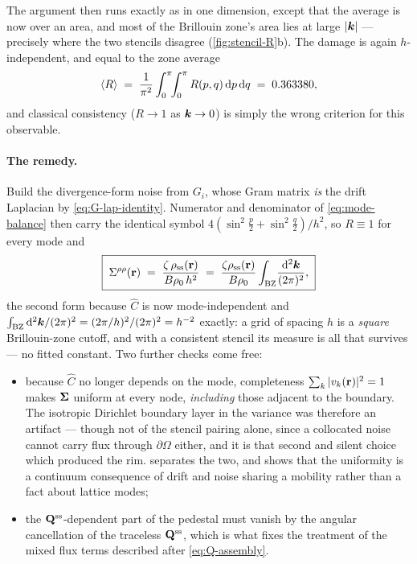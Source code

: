 \documentclass[a5paper]{article}
\begin{document}
The argument then runs exactly as in one dimension, except that the average is now over an area, and most of the Brillouin zone's area lies at large $|\boldsymbol{k}|$ --- precisely where the two stencils disagree (\cref{fig:stencil-R}b). The damage is again $h$-independent, and equal to the zone average
\begin{equation}
    \label{eq:R-average}
    \left\langle R\right\rangle \;=\; \frac{1}{\pi^2}\int_0^\pi\!\!\int_0^\pi R(p,q)\,\mathrm{d} p\,\mathrm{d} q
    \;=\; 0.363380 ,
\end{equation}
and classical consistency ($R\to1$ as $\boldsymbol{k}\to0$) is simply the wrong criterion for this observable.

\paragraph{The remedy.} Build the divergence-form noise from $G_i$, whose Gram matrix \emph{is} the drift Laplacian by \eqref{eq:G-lap-identity}. Numerator and denominator of \eqref{eq:mode-balance} then carry the identical symbol $4(\sin^2\frac p2+\sin^2\frac q2)/h^2$, so $R\equiv1$ for every mode and
\begin{equation}
    \label{eq:pedestal-R1}
    \boxed{\;\Sigma^{\rho\rho}(\mathbf{r}) \;=\; \frac{\zeta\,\rho_{\mathrm{ss}}(\mathbf{r})}{B\rho_0\,h^2}
    \;=\;\frac{\zeta\rho_{\mathrm{ss}}(\mathbf{r})}{B\rho_0}\int_\mathrm{BZ}\!\frac{\mathrm{d}^2\boldsymbol{k}}{(2\pi)^2},\;}
\end{equation}
the second form because $\hat C$ is now mode-independent and $\int_\mathrm{BZ}\mathrm{d}^2\boldsymbol{k}/(2\pi)^2 = (2\pi/h)^2/(2\pi)^2 = h^{-2}$ exactly: a grid of spacing $h$ is a \emph{square} Brillouin-zone cutoff, and with a consistent stencil its measure is all that survives --- no fitted constant. Two further checks come free:
\begin{itemize}
    \item because $\hat C$ no longer depends on the mode, completeness $\sum_k|v_k(\mathbf{r})|^2=1$ makes $\boldsymbol\Sigma$ uniform at every node, \emph{including} those adjacent to the boundary. The isotropic Dirichlet boundary layer in the variance was therefore an artifact --- though not of the stencil pairing alone, since a collocated noise cannot carry flux through $\partial\Omega$ either, and it is that second and silent choice which produced the rim.  separates the two, and shows that the uniformity is a continuum consequence of drift and noise sharing a mobility rather than a fact about lattice modes;
    \item the $\mathbf{Q}^{\mathrm{ss}}$-dependent part of the pedestal must vanish by the angular cancellation of the traceless $\mathbf{Q}^{\mathrm{ss}}$, which is what fixes the treatment of the mixed flux terms described after \eqref{eq:Q-assembly}.
\end{itemize}
\end{document}
